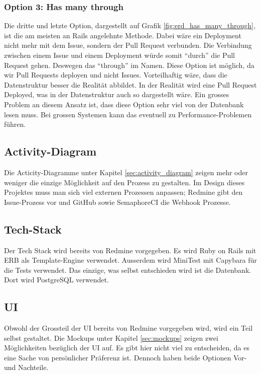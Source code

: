 \subsubsection{Option 3: Has many through}
Die dritte und letzte Option, dargestellt auf Grafik \ref{fig:erd_has_many_through}, ist die am meisten an Rails angelehnte
Methode. Dabei wäre ein Deployment nicht mehr mit dem Issue, sondern der Pull Request verbunden. Die Verbindung zwischen
einem Issue und einem Deployment würde somit \enquote{durch} die Pull Request gehen. Deswegen das \enquote{through} im Namen.
Diese Option ist möglich, da wir Pull Requests deployen und nicht Issues. \newline
Vorteilhaftig wäre, dass die Datenstruktur besser die Realität abbildet. In der Realität wird eine Pull Request Deployed,
was in der Datenstruktur auch so dargestellt wäre. \newline
Ein grosses Problem an diesem Ansatz ist, dass diese Option sehr viel von der Datenbank lesen muss. Bei grossen Systemen
kann das eventuell zu Performance-Problemen führen.

\subsection{Activity-Diagram}
Die Acticity-Diagramme unter Kapitel \ref{sec:activity_diagram} zeigen mehr oder weniger die einzige Möglichkeit auf den
Prozess zu gestalten. Im Design dieses Projektes muss man sich viel externen Prozessen anpassen; Redmine gibt den
Issue-Prozess vor und GitHub sowie SemaphoreCI die Webhook Prozesse.

\subsection{Tech-Stack}
Der Tech Stack wird bereits von Redmine vorgegeben. Es wird Ruby on Rails mit ERB als Template-Engine verwendet. Ausserdem
wird MiniTest mit Capybara für die Tests verwendet. \newline
Das einzige, was selbst entschieden wird ist die Datenbank. Dort wird PostgreSQL verwendet.

\subsection{UI}
Obwohl der Grossteil der UI bereits von Redmine vorgegeben wird, wird ein Teil selbst gestaltet. Die Mockups unter Kapitel
\ref{sec:mockups} zeigen zwei Möglichkeiten bezüglich der UI auf. \newline
Es gibt hier nicht viel zu entscheiden, da es eine Sache von persönlicher Präferenz ist. Dennoch haben beide Optionen
Vor- und Nachteile. \newline

